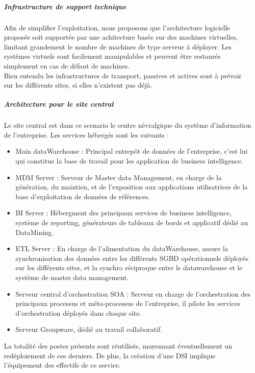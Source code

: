 \subparagraph{Infrastructure de support technique}
Afin de simplifier l'exploitation, nous proposons que l'architecture logicielle proposée soit supportée par une achitecture basée sur des machines virtuelles, limitant grandement le nombre de machines de type serveur à déployer.
Les systèmes virtuels sont facilement manipulables et peuvent être restaurés simplement en cas de défaut de machines.\\
Bien entendu les infrastructures de transport, passives et actives sont à prévoir sur les différents sites, si elles n'existent pas déjà.

\subparagraph{Architecture pour le site central}

Le site central est dans ce scenario le centre névralgique du système d'information de l'entreprise. Les services hébergés sont les suivants :\\

\begin{itemize}
\item Main dataWarehouse : Principal entrepôt de données de l'entreprise, c'est lui qui constitue la base de travail pour les application de business intelligence.
\item MDM Server :  Serveur de Master data Management, en charge de la génération, du maintien, et de l'exposition aux applications utilisatrices de la base d'exploitation de données de références.
\item BI Server : Hébergment des principaux services de business intelligence, système de reporting, générateurs de tableaux de bords et applicatif dédié au DataMining.
\item ETL Server : En charge de l'alimentation du dataWarehouse, assure la synchronisation des données entre les différents SGBD opérationnels déployés sur les différents sites, et la synchro réciproque entre le datawarehouse et le système de master data management.
\item Serveur central d'orchestration SOA : Serveur en charge de l'orchestration des principaux processus et méta-processus de l'entreprise, il pilote les services d'orchestration déployés dans chaque site.
\item Serveur Groupware, dédié au travail collaboratif.
\end{itemize}

La totalité des postes présents sont réutilisés, moyennant éventuellement un redéploiement de ces derniers. De plus, la création d'une DSI implique l'équipement des effectifs de ce service.

